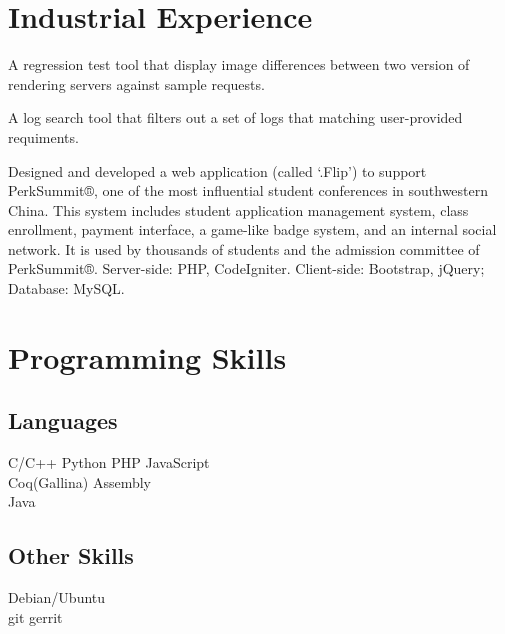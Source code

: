 \documentclass[]{deedy-resume-openfont}
\begin{document}

\section{Industrial Experience}
\begin{tightemize}
\item A regression test tool that display image differences between two version of rendering servers against sample requests.
\item A log search tool that filters out a set of logs that matching user-provided requiments.
\end{tightemize}
\sectionsep


Designed and developed a web application (called ‘.Flip’) to support PerkSummit®, one of the most influential student conferences in southwestern China.
This system includes student application management system, class enrollment, payment interface, a game-like badge system, and an internal social network.
It is used by thousands of students and the admission committee of PerkSummit®.
Server-side: PHP, CodeIgniter. Client-side: Bootstrap, jQuery; Database: MySQL.
\sectionsep


\section{Programming Skills}
\begin{minipage}[t]{.6\textwidth}
\subsection{Languages}
C/C++ \textbullet{} Python \textbullet{} PHP \textbullet{} JavaScript \\
Coq(Gallina) \textbullet{} Assembly \textbullet{} \\
Java

\sectionsep
\end{minipage}
\hfill
\begin{minipage}[t]{.35\textwidth}
\subsection{Other Skills}
Debian/Ubuntu\\
git \textbullet{} gerrit\\
\end{minipage}

\end{document}
